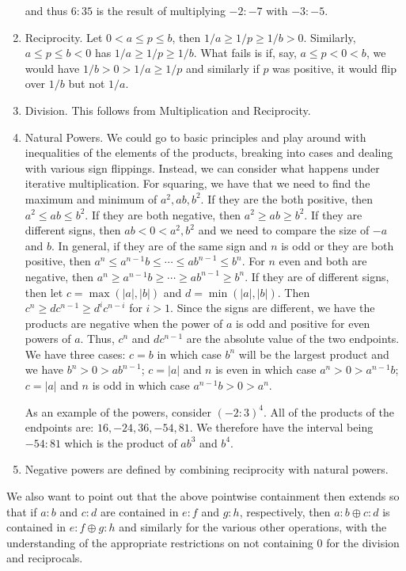 \documentclass[12pt]{article}
\begin{document}
\begin{enumerate}
    and thus $6:35$ is the result of multiplying $-2:-7$ with $-3:-5$.
    
    \item Reciprocity. Let $0 < a \leq p \leq b$, then $1/a \geq 1/p  \geq 1/b > 0$. Similarly, $a \leq p \leq b< 0$ has $1/a \geq 1/p \geq 1/b$. What fails is if, say,  $a \leq p < 0 < b$, we would have $1/b > 0 > 1/a \geq 1/p $ and similarly if $p$ was positive, it would flip over $1/b$ but not $1/a$.
    \item Division. This follows from Multiplication and Reciprocity. 
    \item\label{natpow} Natural Powers. We could go to basic principles and play around with inequalities of the elements of the products, breaking into cases and dealing with various sign flippings. Instead, we can consider what happens under iterative multiplication. For squaring, we have that we need to find the maximum and minimum of $a^2, ab, b^2$. If they are the both positive, then $a^2 \leq ab \leq b^2$. If they are both negative, then $a ^2 \geq ab \geq b^2$. If they are different signs, then $ab < 0 < a^2, b^2$ and we need to compare the size of $-a$ and $b$.  In general, if they are of the same sign and $n$ is odd or they are both positive, then $a^n \leq a^{n-1} b \leq \cdots \leq ab^{n-1} \leq b^n$. For $n$ even and both are negative, then $a^n \geq a^{n-1} b \geq \cdots \geq ab^{n-1} \geq b^n$. If they are of different signs, then let $c = \max( |a|, |b|)$ and $d=\min(|a|, |b|)$. Then  $c^n \geq d c^{n-1} \geq d^{i}c^{n-i}$  for $i > 1$.  Since the signs are different, we have the products are negative when the power of $a$ is odd and positive for even powers of $a$. Thus, $c^n$ and $d c^{n-1}$ are the absolute value of the two endpoints. We have three cases: $c=b$ in which case $b^n$ will be the largest product and we have $b^n > 0 > ab^{n-1}$; $c=|a|$ and $n$ is even in which case $a^n > 0 > a^{n-1} b$; $c=|a|$ and $n$ is odd in which case $a^{n-1} b > 0 > a^n$.  

    As an example of the powers, consider $(-2:3)^4$. All of the products of the endpoints are: $16, -24, 36, -54, 81$. We therefore have the interval being $-54:81$ which is the product of $ab^3$ and $b^4$. 
     
    \item Negative powers are defined by combining reciprocity with natural powers. 
\end{enumerate}


We also want to point out that the above pointwise containment then extends so that if $a:b$ and $c:d$ are contained in $e:f$ and $g:h$, respectively, then $a:b \oplus c:d $ is contained in $e:f \oplus g:h$ and similarly for the various other operations, with the understanding of the appropriate restrictions on not containing 0 for the division and reciprocals. 
\end{document}
